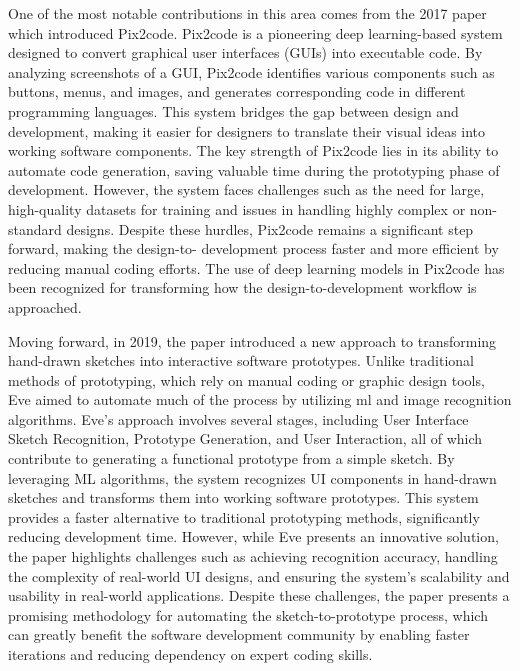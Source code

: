 One of the most notable contributions in this area comes from the
 2017 paper \cite{beltramelli2017pix2codegeneratingcodegraphical} which
  introduced Pix2code. Pix2code is a pioneering deep learning-based
 system designed to convert graphical user interfaces (GUIs) into
 executable code. By analyzing screenshots of a GUI, Pix2code identifies
 various components such as buttons, menus, and images, and generates
 corresponding code in different programming languages. This system 
 bridges the gap between design and development, making it easier 
 for designers to translate their visual ideas into working software 
 components. The key strength of Pix2code lies in its ability to automate 
 code generation, saving valuable time during the prototyping phase of development.
 However, the system faces challenges such as the need for large, high-quality datasets
  for training and issues in handling highly complex or non-standard designs. Despite
these hurdles, Pix2code remains a significant step forward, making the design-to-
development process faster and more efficient by reducing manual coding efforts.
 The use of deep learning models in Pix2code has been recognized for transforming
  how the design-to-development workflow is approached. 

Moving forward, in 2019, the paper \cite{10.1145/3290607.3312994} introduced a new approach to transforming hand-drawn sketches into 
interactive software prototypes. Unlike traditional methods of prototyping, 
which rely on manual coding or graphic design tools, Eve aimed to automate much 
of the process by utilizing \gls{ml} and image recognition algorithms. Eve’s 
approach involves several stages, including User Interface Sketch Recognition, 
Prototype Generation, and User Interaction, all of which contribute to generating 
a functional prototype from a simple sketch. By leveraging ML algorithms, the system 
recognizes UI components in hand-drawn sketches and transforms them into working 
software prototypes. This system provides a faster alternative to traditional prototyping
 methods, significantly reducing development time. However, while Eve presents an 
 innovative solution, the paper highlights challenges such as achieving recognition 
accuracy, handling the complexity of real-world UI designs, and ensuring the system's
 scalability and usability in real-world applications. Despite these challenges, the 
 paper presents a promising methodology for automating the sketch-to-prototype process, 
 which can greatly benefit the software development community by enabling faster 
 iterations and reducing dependency on expert coding skills. 

